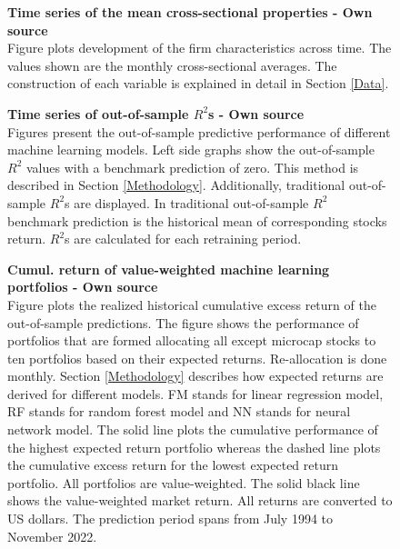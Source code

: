 \documentclass[12pt]{article}
\begin{document}
\begin{appendices}
\begin{figure}[H]
\centering
\caption[Time series of the mean cross-sectional properties]{\textbf{Time series of the mean cross-sectional properties \textnormal{- Own source}}\\ Figure plots development of the firm characteristics across time. The values shown are the monthly cross-sectional averages. The construction of each variable is explained in detail in Section \ref{Data}.}

\label{plot:variableTS}
\end{figure}

\begin{figure}[H]
\centering
\caption[Time series of out-of-sample $R^2$ values]{\textbf{Time series of out-of-sample \boldmath$R^2$s \textnormal{- Own source}}\\ Figures present the out-of-sample predictive performance of different machine learning models. Left side graphs show the out-of-sample $R^2$ values with a benchmark prediction of zero. This method is described in Section \ref{Methodology}. Additionally, traditional out-of-sample $R^2$s are displayed. In traditional out-of-sample $R^2$ benchmark prediction is the historical mean of corresponding stocks return. $R^2$s are calculated for each retraining period.}

\label{plot:OOSR2_ts}
\end{figure}

\begin{figure}[H]
\centering
\caption[Cumulative return of value-weighted machine learning portfolios]{\textbf{Cumul. return of value-weighted machine learning portfolios \textnormal{- Own source}}\\ Figure plots the realized historical cumulative excess return of the out-of-sample predictions. The figure shows the performance of portfolios that are formed allocating all except microcap stocks to ten portfolios based on their expected returns. Re-allocation is done monthly. Section \ref{Methodology} describes how expected returns are derived for different models. FM stands for linear regression model, RF stands for random forest model and NN stands for neural network model. The solid line plots the cumulative performance of the highest expected return portfolio whereas the dashed line plots the cumulative excess return for the lowest expected return portfolio. All portfolios are value-weighted. The solid black line shows the value-weighted market return. All returns are converted to US dollars. The prediction period spans from July 1994 to November 2022.}

\label{plot:cumul_vw_portf_return}
\end{figure}


\end{appendices}
\end{document}
